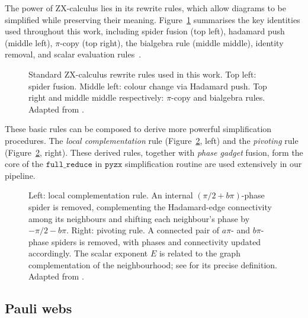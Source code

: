\documentclass[a4paper,onecolumn,11pt,accepted=2026-06-10]{quantumarticle}
\begin{document}
The power of ZX-calculus lies in its rewrite rules, which allow diagrams to be simplified while preserving their meaning. Figure~\ref{fig:zx_rules} summarises the key identities used throughout this work, including spider fusion (top left), hadamard push (middle left), $\pi$-copy (top right), the bialgebra rule (middle middle), identity removal, and scalar evaluation rules~\cite{KissingerWetering2024Book}.

\begin{figure}[h]
\centering
    \caption{Standard ZX-calculus rewrite rules used in this work. Top left: spider fusion. Middle left: colour change via Hadamard push. Top right and middle middle respectively: $\pi$-copy and bialgebra rules. Adapted from \cite{kissinger2022reduced, sutcliffe2024fast}.}
    \label{fig:zx_rules}
\end{figure}

These basic rules can be composed to derive more powerful simplification procedures. The \textit{local complementation} rule (Figure~\ref{fig:lcomp_pivot}, left) and the \textit{pivoting} rule (Figure~\ref{fig:lcomp_pivot}, right). These derived rules, together with \textit{phase gadget} fusion, form the core of the $\mathtt{full\_reduce}$ in $\mathtt{pyzx}$ simplification routine \cite{kissinger2020Pyzx, haenel2026tsimfastuniversalsimulator} are used extensively in our pipeline.

\begin{figure}[h]
\centering
    \quad
    \caption{Left: local complementation rule. An internal $(\pi/2 + b\pi)$-phase spider is removed, complementing the Hadamard-edge connectivity among its neighbours and shifting each neighbour's phase by $-\pi/2 - b\pi$. Right: pivoting rule. A connected pair of $a\pi$- and $b\pi$-phase spiders is removed, with phases and connectivity updated accordingly. The scalar exponent $E$ is related to the graph complementation of the neighbourhood; see \cite{kissinger2022reduced} for its precise definition. Adapted from \cite{kissinger2022reduced, haenel2026tsimfastuniversalsimulator}.}
    \label{fig:lcomp_pivot}
\end{figure}

\subsection{Pauli webs}
\label{sec:pauli-webs-prelim}
\end{document}
